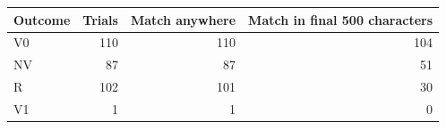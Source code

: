 \begin{tabular}{lrrr}
\toprule
Outcome & Trials & Match anywhere & Match in final 500 characters \\
\midrule
V0 & 110 & 110 & 104 \\
NV & 87 & 87 & 51 \\
R & 102 & 101 & 30 \\
V1 & 1 & 1 & 0 \\
\bottomrule
\end{tabular}
